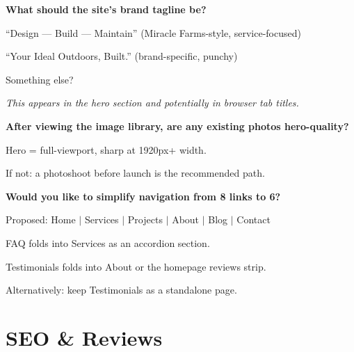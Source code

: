 \documentclass[11pt, letterpaper]{article}
\begin{document}
\begin{checklist}
  \item \textbf{What should the site's brand tagline be?}
    \begin{checklist}
      \item ``Design --- Build --- Maintain'' \quad (Miracle Farms-style, service-focused)
      \item ``Your Ideal Outdoors, Built.'' \quad (brand-specific, punchy)
      \item Something else?
    \end{checklist}
    \textit{\small This appears in the hero section and potentially in browser tab titles.}

  \item \textbf{After viewing the image library, are any existing photos
        hero-quality?}
    \begin{checklist}
      \item Hero = full-viewport, sharp at 1920px+ width.
      \item If not: a photoshoot before launch is the recommended path.
    \end{checklist}

  \item \textbf{Would you like to simplify navigation from 8 links to 6?}
    \begin{checklist}
      \item Proposed: Home $|$ Services $|$ Projects $|$ About $|$ Blog $|$ Contact
      \item FAQ folds into Services as an accordion section.
      \item Testimonials folds into About or the homepage reviews strip.
      \item Alternatively: keep Testimonials as a standalone page.
    \end{checklist}
\end{checklist}

\section{SEO \& Reviews}
\end{document}
